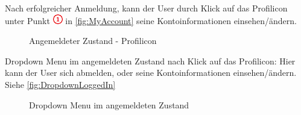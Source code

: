 \documentclass[11pt,ngerman]{article}
\begin{document}
    \noindent Nach erfolgreicher Anmeldung, kann der User durch Klick auf das Profilicon unter Punkt \includegraphics{figures/1.png} in \autoref{fig:MyAccount} seine Kontoinformationen einsehen/ändern.

    \begin{figure}[H]
    	\centering
    	\caption{Angemeldeter Zustand - Profilicon}
    	\label{fig:MyAccount}
    \end{figure}

    \noindent Dropdown Menu im angemeldeten Zustand nach Klick auf das Profilicon: Hier kann der User sich abmelden, oder seine Kontoinformationen einsehen/ändern. Siehe \autoref{fig:DropdownLoggedIn}

    \begin{figure}[H]
        \centering
        \caption{Dropdown Menu im angemeldeten Zustand}
        \label{fig:DropdownLoggedIn}
    \end{figure}
\end{document}
